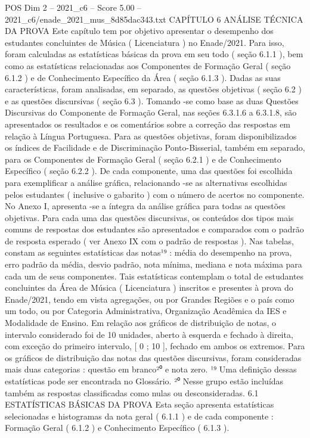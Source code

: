 \begin{textsample}{POS Dim 2 – 2021\_c6 – Score 5.00 – 2021\_c6/enade\_2021\_mus\_8d85dac343.txt}  \label{ex:f2_pos_172}
CAPÍTULO 6 ANÁLISE TÉCNICA DA PROVA Este capítulo tem por objetivo apresentar o desempenho dos estudantes concluintes de Música ( Licenciatura ) no Enade/2021.
Para isso, foram calculadas as estatísticas básicas da prova em seu todo ( seção 6.1.1 ), bem como as estatísticas relacionadas aos Componentes de Formação Geral ( seção 6.1.2 ) e de Conhecimento Específico da Área ( seção 6.1.3 ).
Dadas as suas características, foram analisadas, em separado, as questões objetivas ( seção 6.2 ) e as questões discursivas ( seção 6.3 ).
Tomando -se como base as duas Questões Discursivas do Componente de Formação Geral, nas seções 6.3.1.6 a 6.3.1.8, são apresentados os resultados e os comentários sobre a correção das respostas em relação à Língua Portuguesa.
Para as questões objetivas, foram disponibilizados os índices de Facilidade e de Discriminação Ponto-Bisserial, também em separado, para os Componentes de Formação Geral ( seção 6.2.1 ) e de Conhecimento Específico ( seção 6.2.2 ).
De cada componente, uma das questões foi escolhida para exemplificar a análise gráfica, relacionando -se as alternativas escolhidas pelos estudantes ( inclusive o gabarito ) com o número de acertos no componente.
No Anexo I, apresenta -se a íntegra da análise gráfica para todas as questões objetivas.
Para cada uma das questões discursivas, os conteúdos dos tipos mais comuns de respostas dos estudantes são apresentados e comparados com o padrão de resposta esperado ( ver Anexo IX com o padrão de respostas ).
Nas tabelas, constam as seguintes estatísticas das notas¹⁹ : média do desempenho na prova, erro padrão da média, desvio padrão, nota mínima, mediana e nota máxima para cada um de seus componentes.
Tais estatísticas contemplam o total de estudantes concluintes da Área de Música ( Licenciatura ) inscritos e presentes à prova do Enade/2021, tendo em vista agregações, ou por Grandes Regiões e o país como um todo, ou por Categoria Administrativa, Organização Acadêmica da IES e Modalidade de Ensino.
Em relação aos gráficos de distribuição de notas, o intervalo considerado foi de 10 unidades, aberto à esquerda e fechado à direita, com exceção do primeiro intervalo, [ 0 ; 10 ], fechado em ambos os extremos.
Para os gráficos de distribuição das notas das questões discursivas, foram consideradas mais duas categorias : questão em branco²⁰ e nota zero. ¹⁹ Uma definição dessas estatísticas pode ser encontrada no Glossário. ²⁰ Nesse grupo estão incluídas também as respostas classificadas como nulas ou desconsideradas. 6.1 ESTATÍSTICAS BÁSICAS DA PROVA Esta seção apresenta estatísticas selecionadas e histogramas da nota geral ( 6.1.1 ) e de cada componente : Formação Geral ( 6.1.2 ) e Conhecimento Específico ( 6.1.3 ).

\end{textsample}

